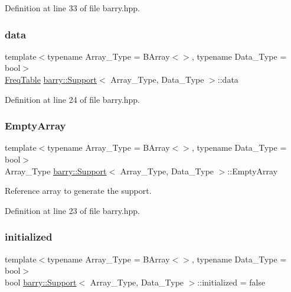 Definition at line 33 of file barry.\+hpp.

\mbox{\label{classbarry_1_1_support_afae160c07727e72f36fcf5a16828ed21}} 
\subsubsection{\texorpdfstring{data}{data}}
{\footnotesize\ttfamily template$<$typename Array\+\_\+\+Type  = B\+Array$<$$>$, typename Data\+\_\+\+Type  = bool$>$ \\
\hyperlink{classbarry_1_1_freq_table}{Freq\+Table} \hyperlink{classbarry_1_1_support}{barry\+::\+Support}$<$ Array\+\_\+\+Type, Data\+\_\+\+Type $>$\+::data}



Definition at line 24 of file barry.\+hpp.

\mbox{\label{classbarry_1_1_support_ae26e46356041286028ffcc27195b9e8a}} 
\subsubsection{\texorpdfstring{Empty\+Array}{EmptyArray}}
{\footnotesize\ttfamily template$<$typename Array\+\_\+\+Type  = B\+Array$<$$>$, typename Data\+\_\+\+Type  = bool$>$ \\
Array\+\_\+\+Type \hyperlink{classbarry_1_1_support}{barry\+::\+Support}$<$ Array\+\_\+\+Type, Data\+\_\+\+Type $>$\+::Empty\+Array}



Reference array to generate the support. 



Definition at line 23 of file barry.\+hpp.

\mbox{\label{classbarry_1_1_support_a737bc10d6a6e4e3b18aeef0228bd45bb}} 
\subsubsection{\texorpdfstring{initialized}{initialized}}
{\footnotesize\ttfamily template$<$typename Array\+\_\+\+Type  = B\+Array$<$$>$, typename Data\+\_\+\+Type  = bool$>$ \\
bool \hyperlink{classbarry_1_1_support}{barry\+::\+Support}$<$ Array\+\_\+\+Type, Data\+\_\+\+Type $>$\+::initialized = false}



